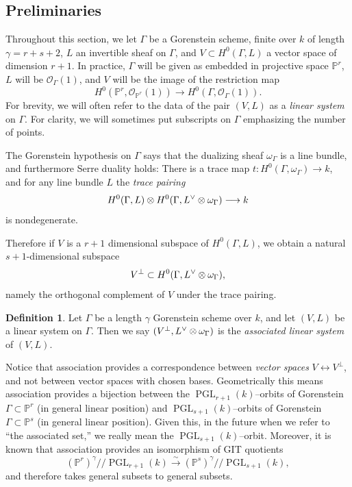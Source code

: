 \documentclass[reqno, 11pt]{amsart}
\theoremstyle{definition}
\theoremstyle{remark}
\numberwithin{equation}{section}
\numberwithin{thm}{section}
\numberwithin{prop}{section}
\numberwithin{lem}{section}
\numberwithin{cor}{section}
\numberwithin{conj}{section}
\numberwithin{defn}{section}
\renewcommand{\to}{\longrightarrow}
\newcommand {\from}{{\colon}}
\DeclareMathOperator\PGL{PGL}
\theoremstyle{plain}
\theoremstyle{definition}
\newtheorem{definition}[theorem]{Definition}
\newcommand\bp{{\mathbb P}}
\newcommand\so{{\mathscr O}}
\begin{document}
\subsection{Preliminaries} Throughout this section, we let $\Gamma$ be a Gorenstein scheme, finite over $k$ of length $\gamma = r + s + 2$, $L$ an invertible sheaf on $\Gamma$, and $V \subset H^{0}(\Gamma, L)$ a vector space of dimension $r+1$.  In practice, $\Gamma$ will be given as embedded in projective space $\bp^{r}$, $L$ will be $\so_{\Gamma}(1)$, and $V$ will be the image of the restriction map \[H^{0}(\bp^{r}, \so_{\bp^{r}}(1) ) \to H^{0}(\Gamma, \so_{\Gamma}(1)).\] 
For brevity, we will often refer to the data of the pair $(V, L)$ as a {\sl linear system} on $\Gamma$. For clarity, we will sometimes put subscripts on $\Gamma$ emphasizing the number of points.

The Gorenstein hypothesis on $\Gamma$ says that the dualizing sheaf $\omega_{\Gamma}$ is a line bundle, and furthermore Serre duality holds: There is a trace map $t \from H^{0}(\Gamma, \omega_{\Gamma}) \to k$, and for any line bundle $L$ the {\sl trace pairing}  \[H^{0}(\Gamma, L) \otimes H^{0}(\Gamma, {\dual L} \otimes \omega_{\Gamma}) \to k\] is nondegenerate.  

Therefore if $V$ is a $r+1$ dimensional subspace of $H^{0}(\Gamma, L)$, we obtain a natural $s+1$-dimensional subspace \[V^{\perp} \subset H^{0}(\Gamma, {L^{\vee}} \otimes \omega_{\Gamma}),\] namely the orthogonal complement of $V$ under the trace pairing.

\begin{definition}\label{def:associatedseries}
Let $\Gamma$ be a length $\gamma$ Gorenstein scheme over $k$, and let $(V, L)$ be a linear system on $\Gamma$. Then we say $(V^{\perp}, {L^{\vee}} \otimes \omega_{\Gamma})$ is the {\sl associated linear system} of $(V,L)$.
\end{definition} 

Notice that association provides a correspondence between {\sl vector spaces} $V \leftrightarrow V^{\perp}$, and not between vector spaces with chosen bases. Geometrically this means association provides a bijection between the $\PGL_{r+1}(k)$--orbits of Gorenstein $\Gamma \subset \bp^{r}$ (in general linear position) and $\PGL_{s+1}(k)$--orbits of Gorenstein $\Gamma \subset \bp^{s}$ (in general linear position).  Given this, in the future when we refer to ``the associated set,'' we really mean the $\PGL_{s+1}(k)$--orbit.  Moreover, it is known that association provides an isomorphism of GIT quotients \[(\bp^{r})^{\gamma}//\PGL_{r+1}(k) \xrightarrow{\sim} (\bp^{s})^{\gamma}//\PGL_{s+1}(k),\] and therefore takes general subsets to general subsets.
\end{document}
